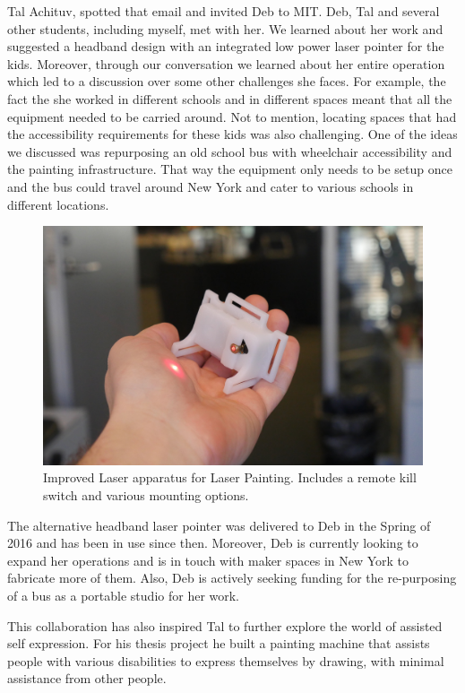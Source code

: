 Tal Achituv, spotted that email and invited Deb to MIT. Deb, Tal and several other students, including myself, met with her. We learned about her work and suggested a headband design with an integrated low power laser pointer for the kids. Moreover, through our conversation we learned about her entire operation which led to a discussion over some other challenges she faces. For example, the fact the she worked in different schools and in different spaces meant that all the equipment needed to be carried around. Not to mention, locating spaces that had the accessibility requirements for these kids was also challenging. One of the ideas we discussed was repurposing an old school bus with wheelchair accessibility and the painting infrastructure. That way the equipment only needs to be setup once and the bus could travel around New York and cater to various schools in different locations. 

   \begin{figure}[thpb]
      \centering
      \includegraphics[width=\textwidth]{figures/new-laser.jpg}
      \caption{Improved Laser apparatus for Laser Painting. Includes a remote kill switch and  various mounting options.}
      \label{new-laser}
   \end{figure}


The alternative headband laser pointer was delivered to Deb in the Spring of 2016 and has been in use since then. Moreover, Deb is currently looking to expand her operations and is in touch with maker spaces in New York to fabricate more of them. Also, Deb is actively seeking funding for the re-purposing of a bus as a portable studio for her work. 

This collaboration has also inspired Tal to further explore the world of assisted self expression.  For his thesis project he built a painting machine that assists people with various disabilities to express themselves by drawing, with minimal assistance from other people\cite{projexpress}. 

